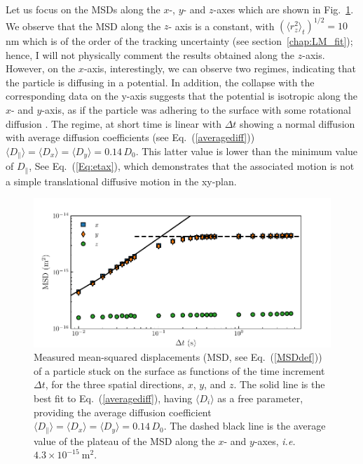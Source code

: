 Let us focus on the \gls{MSD}s along the $x$-, $y$- and $z$-axes which are shown in Fig.~\ref{fig.MSD_stucked}. We observe that the \gls{MSD} along the $z$- axis is a constant, with $(\langle r_z^2 \rangle_t)^{1/2} = 10 $~ nm which is of the order of the tracking uncertainty (see section~\ref{chap:LM_fit}); hence, I will not physically comment the results obtained along the $z$-axis. However, on the $x$-axis, interestingly, we can observe two regimes, indicating that the particle is diffusing in a potential. In addition, the collapse with the corresponding data on the y-axis suggests that the potential is isotropic along the $x$- and $y$-axis, as if the particle was adhering to the surface with some rotational diffusion \cite{dominik_resistance_1995,ding_rolling_2008,jonas_mechanical_2019}. The regime, at short time is linear with $\Delta t$ showing a normal diffusion with  average diffusion coefficients (see Eq.~(\ref{averagediff}))  $\langle{D_\parallel}\rangle= \langle D_x\rangle=\langle D_y \rangle =0.14\,D_0$. This latter value is lower than the minimum value of $D_\parallel$, See Eq.~(\ref{Eq:etax}), which demonstrates that the associated motion is not a simple translational diffusive motion in the xy-plan.



\begin{figure}[H]
	\centering
	\includegraphics{02_body/chapter4/images/stucked_particle/MSD_stucked.pdf}
	\caption{Measured mean-squared displacements (MSD, see Eq.~(\ref{MSDdef})) of a particle stuck on the surface  as functions of the time increment $\Delta t$, for the three spatial directions, $x$, $y$, and $z$. The solid line is the best fit to Eq.~(\ref{averagediff}), having $\langle D_i \rangle$ as a free parameter,
		providing the average diffusion coefficient $\langle{D_\parallel}\rangle= \langle D_x\rangle=\langle D_y \rangle =0.14\,D_0$. The dashed black line is the average value of the plateau of the MSD along the $x$- and $y$-axes, \textit{i.e.} $ 4.3 \times 10 ^{-15} ~ \mathrm{m^2}$.~\href{https://github.com/eXpensia/Confined-Brownian-Motion/blob/main/02_body/chapter4/images/stucked_particle/Full\%20analysis\%20trajectory_using_Dyacine_adding_x_y_distrib.ipynb}{\faGithub}}
	\label{fig.MSD_stucked}
\end{figure}

